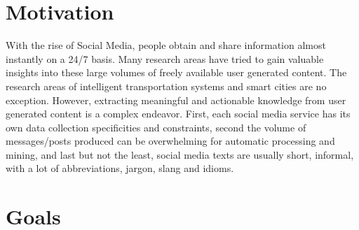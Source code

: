 \documentclass[9pt,a4paper]{extarticle}
\begin{document}
\begin{multicols}{2}

\section{Motivation}\label{sec:motiva}



With the rise of Social Media, people obtain and share information almost instantly on a 24/7 basis. Many research areas have tried to gain valuable insights into these large volumes of freely available user generated content. The research areas of intelligent transportation systems and smart cities are no exception. However, extracting meaningful and actionable knowledge from user generated content is a complex endeavor. First, each social media service has its own data collection specificities and constraints, second the volume of messages/posts produced can be overwhelming for automatic processing and mining, and last but not the least, social media texts are usually short, informal, with a lot of abbreviations, jargon, slang and idioms.

\section{Goals}\label{sec:goals}



\end{multicols}
\end{document}
